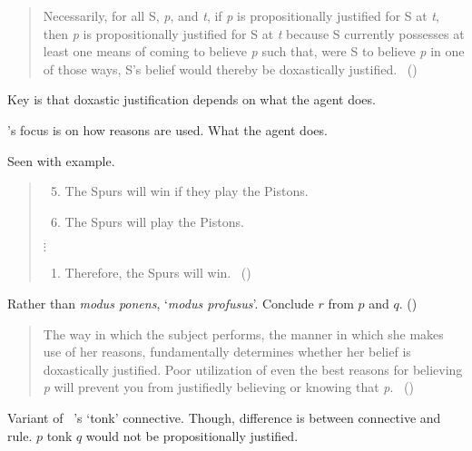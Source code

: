 \begin{note}
  \citeauthor{Turri:2010aa}

  \begin{quote}
    Necessarily, for all S, \emph{p}, and \emph{t}, if \emph{p} is propositionally justified for S at \emph{t}, then \emph{p} is propositionally justified for S at \emph{t} because S currently possesses at least one means of coming to believe \emph{p} such that, were S to believe \emph{p} in one of those ways, S's belief would thereby be doxastically justified.%
    \mbox{ }\hfill\mbox{(\citeyear[316]{Turri:2010aa})}
  \end{quote}

  Key is that doxastic justification depends on what the agent does.

  \citeauthor{Turri:2010aa}'s focus is on how reasons are used.
  What the agent does.

  Seen with example.

  \begin{quote}
    \begin{enumerate}[label=(P\arabic*)]
      \setcounter{enumi}{4}
    \item
      The Spurs will win if they play the Pistons.
    \item
      The Spurs will play the Pistons.
    \end{enumerate}

    \mbox{}\hfill\(\vdots\)\hfill\mbox{}

    \begin{enumerate}[label=(P\arabic*), resume]
    \item
      Therefore, the Spurs will win.%
    \mbox{ }\hfill\mbox{(\citeyear[317]{Turri:2010aa})}
    \end{enumerate}
  \end{quote}

  Rather than \emph{modus ponens}, `\emph{modus profusus}'.
  Conclude \(r\) from \(p\) and \(q\).
  (\citeyear[317]{Turri:2010aa})

  \begin{quote}
    The way in which the subject performs, the manner in which she makes use of her reasons, fundamentally determines whether her belief is doxastically justified.
    Poor utilization of even the best reasons for believing \emph{p} will prevent you from justifiedly believing or knowing that \emph{p}.%
    \mbox{ }\hfill\mbox{(\citeyear[316]{Turri:2010aa})}
  \end{quote}

  Variant of ~\cite{Prior:1960wh}'s `tonk' connective.
  Though, difference is between connective and rule.
  \(p\) tonk \(q\) would not be propositionally justified.
\end{note}

